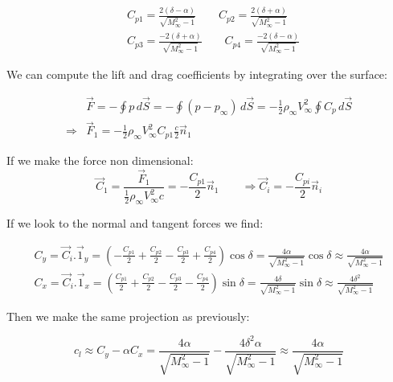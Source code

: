 	\begin{equation}
	\begin{aligned}
	&C_{p1} = \frac{2(\delta - \alpha)}{\sqrt{M_\infty^2 -1}} \qquad C_{p2} = \frac{2(\delta + \alpha)}{\sqrt{M_\infty^2 -1}} \\
	&C_{p3} = \frac{-2(\delta + \alpha)}{\sqrt{M_\infty^2 -1}} \qquad C_{p4} = \frac{-2(\delta - \alpha)}{\sqrt{M_\infty^2 -1}}
	\end{aligned}
	\end{equation}
	
	We can compute the lift and drag coefficients by integrating over the surface:
	
	\begin{equation}
	\begin{aligned}
	&\vec{F} = -\oint p\, d\vec{S} = -\oint (p-p_\infty)\, d\vec{S} = -\frac{1}{2} \rho _\infty V_\infty ^2 \oint C_p\, d\vec{S}\\
	\Rightarrow &\vec{F}_1 = -\frac{1}{2} \rho _\infty V_\infty ^2 C_{p1} \frac{c}{2} \vec{n}_1
	\end{aligned}
	\end{equation}
	
	If we make the force non dimensional: 
	\begin{equation}
	\vec{C}_1 = \frac{\vec{F}_1}{\frac{1}{2}\rho _\infty V_\infty ^2 c} = -\frac{C_{p1}}{2} \vec{n}_1 \qquad \Rightarrow \vec{C}_i = -\frac{C_{pi}}{2} \vec{n}_i
	\end{equation}
	
	If we look to the normal and tangent forces we find: 
	
	\begin{equation}
	\begin{aligned}
	C_y = \vec{C}_i .\vec{1}_y = \left(-\frac{C_{p1}}{2} + \frac{C_{p2}}{2} -\frac{C_{p3}}{2} +\frac{C_{p4}}{2} \right) \cos \delta= \frac{4\alpha }{\sqrt{M_\infty ^2 -1}} \cos \delta \approx \frac{4\alpha }{\sqrt{M_\infty ^2 -1}}\\
	C_x = \vec{C}_i .\vec{1}_x = \left(\frac{C_{p1}}{2} + \frac{C_{p2}}{2} -\frac{C_{p3}}{2} -\frac{C_{p4}}{2} \right) \sin \delta = \frac{4\delta }{\sqrt{M_\infty ^2 -1}} \sin \delta \approx \frac{4\delta ^2}{\sqrt{M_\infty ^2 -1}}
	\end{aligned}
	\end{equation}
	
	Then we make the same projection as previously: 
	
	\begin{equation}
	c_l \approx C_y - \alpha C_x = \frac{4\alpha }{\sqrt{M_\infty ^2 -1}} - \frac{4\delta ^2\alpha }{\sqrt{M_\infty ^2 -1}}  \approx \frac{4\alpha }{\sqrt{M_\infty ^2 -1}} 
	\end{equation}
	
